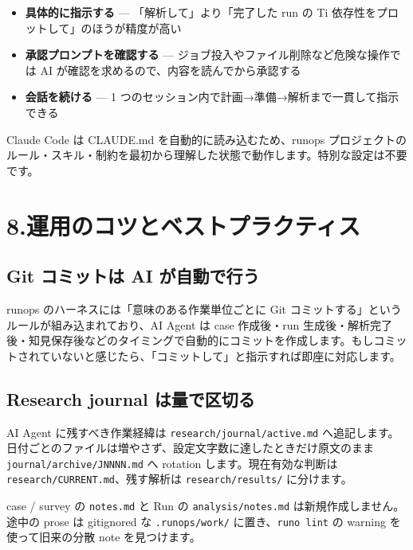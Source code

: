 \documentclass[a4paper,11pt]{article}
\newenvironment{infobox}{%
  \medskip\noindent
  \fboxrule=0.5pt\fboxsep=8pt
  \fcolorbox{infoframe}{infobg}\bgroup\minipage{\dimexpr\linewidth-2\fboxsep-2\fboxrule}
}{%
  \endminipage\egroup\medskip
}
\begin{document}
\begin{itemize}[nosep]
  \item \textbf{具体的に指示する} --- 「解析して」より「完了した run の Ti 依存性をプロットして」のほうが精度が高い
  \item \textbf{承認プロンプトを確認する} --- ジョブ投入やファイル削除など危険な操作では AI が確認を求めるので、内容を読んでから承認する
  \item \textbf{会話を続ける} --- 1 つのセッション内で計画→準備→解析まで一貫して指示できる
\end{itemize}

\begin{infobox}
Claude Code は CLAUDE.md を自動的に読み込むため、runops プロジェクトのルール・スキル・制約を最初から理解した状態で動作します。特別な設定は不要です。
\end{infobox}

\section*{\color{darkblue} 8.\quad 運用のコツとベストプラクティス}

\subsection*{\color{accent} Git コミットは AI が自動で行う}

runops のハーネスには「意味のある作業単位ごとに Git コミットする」というルールが組み込まれており、AI Agent は case 作成後・run 生成後・解析完了後・知見保存後などのタイミングで自動的にコミットを作成します。もしコミットされていないと感じたら、「コミットして」と指示すれば即座に対応します。

\subsection*{\color{accent} Research journal は量で区切る}

AI Agent に残すべき作業経緯は \texttt{research/journal/active.md} へ追記します。日付ごとのファイルは増やさず、設定文字数に達したときだけ原文のまま \texttt{journal/archive/JNNNN.md} へ rotation します。現在有効な判断は \texttt{research/CURRENT.md}、残す解析は \texttt{research/results/} に分けます。

case / survey の \texttt{notes.md} と Run の \texttt{analysis/notes.md} は新規作成しません。
途中の prose は gitignored な \texttt{.runops/work/} に置き、\texttt{runo lint} の warning を
使って旧来の分散 note を見つけます。
\end{document}
